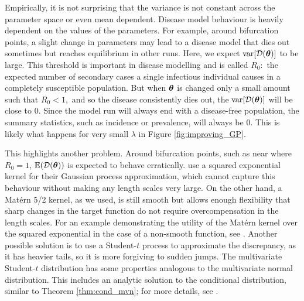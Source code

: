 Empirically, it is not surprising that the variance is not constant across the
parameter space or even mean dependent. Disease model behaviour is heavily
dependent on the values of the parameters. For example, around bifurcation points,
a slight change in parameters may lead to a disease model that dies out 
sometimes but reaches equilibrium in other runs. Here, we expect
$\operatorname{var}[\mathcal{D}(\bm{\theta})]$ to be large. This threshold is important in disease 
modelling and is called $R_0:$ the expected number of secondary cases a single
infectious individual causes in a completely susceptible population.
But when $\bm{\theta}$ is changed only a small
amount such that $R_0<1,$ and so 
the disease consistently dies out, the $\operatorname{var}[\mathcal{D}(\bm{\theta})]$
will be close to $0.$ Since the model
run will always end with a disease-free population, the summary statistics,
such as incidence or prevalence, will always be $0.$ This is likely what
happens for very small $\lambda$ in Figure \ref{fig:improving_GP}.

This highlights another problem. Around bifurcation points, such as near where
$R_0 = 1$, $\operatorname{\mathbb{E}}(\mathcal{D}(\bm{\theta}))$ is expected to behave 
erratically.  use a
squared exponential kernel for their Gaussian process approximation, which
cannot capture this behaviour without
making any length scales very large.
On the other hand, a Mat\'ern 5/2 kernel, as we used, is still smooth but allows
enough flexibility that sharp changes in the target function do not require
overcompensation in the length scales.
For an example demonstrating the utility of the Mat\'ern
kernel over the squared exponential in the case of a non-smooth function,
see \cite{jones_matern_2021}.
Another possible solution is to use a Student-$t$ process to approximate the
discrepancy, as it has heavier tails, so it is more forgiving to sudden jumps.
The multivariate Student-$t$ distribution has some properties analogous to
the multivariate normal distribution. This includes an analytic solution
to the conditional distribution, similar to Theorem \ref{thm:cond_mvn}; for
more details, see \cite{shah_studentt_2014}.

